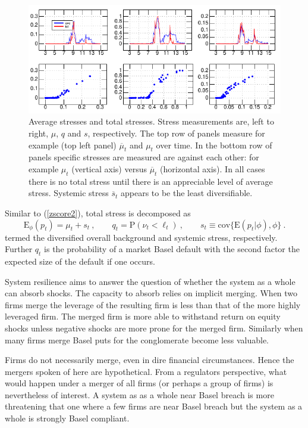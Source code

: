 \documentclass[12pt]{article}
\newcommand{\E}{\mathrm{E}}
\newcommand{\cov}{\mathrm{cov}}
\newcommand{\Es}{\E_\phi}
\newcommand{\eref}[1]{(\ref{#1})}
\newcommand{\cq}{\ , \qquad}
\renewcommand{\P}{\mathrm{P}}
\newcommand{\be}[1]{\begin{equation}\label{#1}}
\newcommand{\ee}{\end{equation}}
\begin{document}
\begin{figure}[htbp]
\begin{center}
\includegraphics{figures/muqs.pdf}
\caption{Average  stresses and  total stresses.   Stress measurements are, left to right, $\mu$, $q$ and $s$, respectively.   The top row of panels measure for example (top left panel)  $\overline \mu_t$ and $\mu_t$ over time.    In the bottom row of panels  specific stresses are measured are against each other:  for example $\mu_t$ (vertical axis) versus $\overline\mu_t$ (horizontal axis).  In all cases there is no total stress until there is an appreciable level of average stress.  Systemic stress $\overline s_t$ appears to be the least diversifiable.}\label{muqs}
\end{center}
\end{figure}

Similar  to \eref{zscore2}, total  stress is decomposed as
\be{overall}
\Es(p_t) = \mu_t  + s_t\cq q_{t}=\P(\nu_t<\ell_t) \cq  s_t \equiv \cov\{\E(p_t|\phi),\phi\}\ .
\ee
termed the diversified overall background  and systemic stress, respectively.   Further $q_t$ is the probability of  a market Basel default with the second factor the expected size of the default if one occurs.

System resilience aims to answer the question of whether the system as a whole can absorb shocks.   The capacity to absorb relies on implicit merging.  When two firms merge the leverage of the resulting firm is less than that of the more highly leveraged firm.   The merged firm is more able to withstand return on equity shocks  unless negative shocks are more prone for the merged firm.   Similarly when many firms merge Basel puts for the conglomerate become less valuable.

Firms do not necessarily merge, even in dire financial circumstances.   Hence the mergers spoken of here are hypothetical.   From a regulators perspective, what would happen under a merger of all firms (or perhaps a group of firms) is nevertheless of interest.   A system as as a whole near Basel breach is more threatening that one where a few firms are near Basel breach but the system as a whole is strongly Basel compliant.
\end{document}

